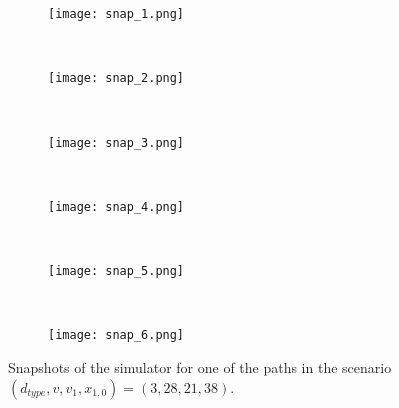 \begin{figure}[h]
\centering
\begin{subfigure}{0.75\textwidth}
  \centering
  \texttt{[image: snap\_1.png]}
\end{subfigure}\\ \vspace{2px}
\begin{subfigure}{0.75\textwidth}
  \centering
  \texttt{[image: snap\_2.png]}
\end{subfigure} \\ \vspace{2px}
\begin{subfigure}{0.75\textwidth}
  \centering
  \texttt{[image: snap\_3.png]}
\end{subfigure} \\ \vspace{2px}
\begin{subfigure}{0.75\textwidth}
  \centering
  \texttt{[image: snap\_4.png]}
\end{subfigure} \\ \vspace{2px}
\begin{subfigure}{0.75\textwidth}
  \centering
  \texttt{[image: snap\_5.png]}
\end{subfigure} \\ \vspace{2px}
\begin{subfigure}{0.75\textwidth}
  \centering
  \texttt{[image: snap\_6.png]}
\end{subfigure}
\caption{Snapshots of the simulator for one of the paths in the scenario $(d_{type}, v, v_1, x_{1,0}) = (3, 28, 21, 38)$.}
\label{fig:example_sim}
\end{figure}


